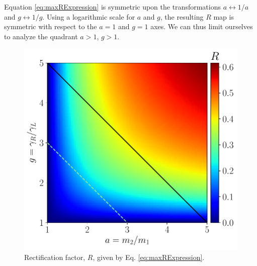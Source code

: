 Equation \eqref{eq:maxRExpression} is symmetric upon the transformations $a \leftrightarrow 1/a$ and $g \leftrightarrow 1/g$. Using a logarithmic scale for $a$ and $g$, the resulting $R$ map is symmetric with respect to the $a=1$ and $g=1$ axes. We can thus limit ourselves to analyze the quadrant $a > 1$, $g > 1$.


\begin{figure}
  \includegraphics[width=\linewidth]{Figures/Rade.pdf}
  \caption{Rectification factor, $R$, given by Eq. \eqref{eq:maxRExpression}.}
  \label{fig:R_g_a_plane}
\end{figure}

